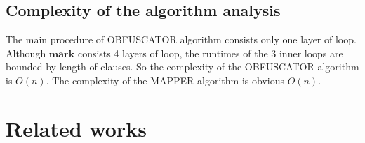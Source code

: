 \documentclass[runningheads,a4paper]{llncs}
\begin{document}
% 
% 
% 
% 
% 
% 

\subsection{Complexity of the algorithm analysis} 

The main procedure of OBFUSCATOR algorithm consists only one layer of loop.
Although $\mathbf{mark}$ consists 4 layers of loop,
the runtimes of the 3 inner loops are bounded by length of clauses.
So the complexity of the OBFUSCATOR algorithm is $O(n)$. 
The complexity of the MAPPER algorithm is obvious $O(n)$.

\section{Related works}\label{related}
\end{document}

